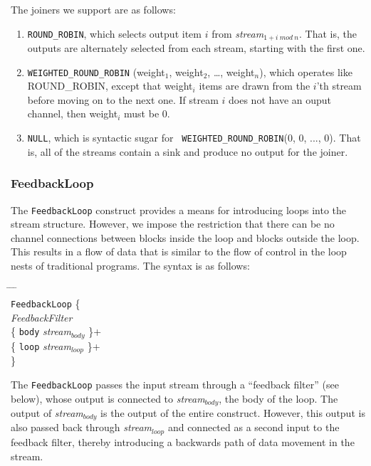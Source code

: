 The joiners we support are as follows:

\begin{enumerate}

\item {\tt ROUND\_ROBIN}, which selects output item $i$ from {\it
stream$_{1+i~mod~n}$}.  That is, the outputs are alternately selected
from each stream, starting with the first one.

\item {\tt WEIGHTED\_ROUND\_ROBIN} (weight$_1$, weight$_2$, \dots,
weight$_n$), which operates like ROUND\_ROBIN, except that weight$_i$
items are drawn from the $i$'th stream before moving on to the next
one.  If stream $i$ does not have an ouput channel, then weight$_i$
must be 0.

\item {\tt NULL}, which is syntactic sugar for {\tt
WEIGHTED\_ROUND\_ROBIN}(0, 0, ..., 0).  That is, all of the streams
contain a sink and produce no output for the joiner.

\end{enumerate}

\subsubsection{FeedbackLoop}

The {\tt FeedbackLoop} construct provides a means for introducing
loops into the stream structure.  However, we impose the restriction
that there can be no channel connections between blocks inside the
loop and blocks outside the loop.  This results in a flow of data that
is similar to the flow of control in the loop nests of traditional
programs.  The syntax is as follows:

\begin{tabbing}
\hspace{0.2in} \= \hspace{0.2in} \= \hspace{0.2in} \= \hspace{0.2in} \= \\

{\tt FeedbackLoop} \{ \\
\> {\it FeedbackFilter} \\
\> \{ {\tt body} {\it stream$_{body}$} \}+ \\
\> \{ {\tt loop} {\it stream$_{loop}$} \}+ \\
\}
\end{tabbing}

The {\tt FeedbackLoop} passes the input stream through a ``feedback
filter'' (see below), whose output is connected to {\it
stream$_{body}$}, the body of the loop.  The output of {\it
stream$_{body}$} is the output of the entire construct.  However, this
output is also passed back through {\it stream$_{loop}$} and connected
as a second input to the feedback filter, thereby introducing a
backwards path of data movement in the stream.

